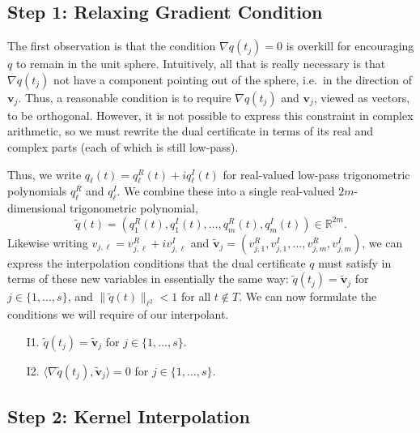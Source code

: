 \documentclass[11pt]{article}
\newcommand{\ra}{\rangle}
\newcommand{\la}{\langle}
\newcommand{\RR}{\mathbb{R}}
\newcommand{\bv}{\bm v}
\begin{document}
\subsection{Step 1: Relaxing Gradient Condition}

The first observation is that the condition $\nabla q(t_j) = 0$ is overkill for encouraging $q$ to remain in the unit sphere.
Intuitively, all that is really necessary is that $\nabla q(t_j)$ not have a component pointing out of the sphere, i.e.\ in the direction of $\bv_j$.
Thus, a reasonable condition is to require $\nabla q(t_j)$ and $\bv_j$, viewed as vectors, to be orthogonal.
However, it is not possible to express this constraint in complex arithmetic, so we must rewrite the dual certificate in terms of its real and complex parts (each of which is still low-pass).

Thus, we write $q_\ell(t) = q_\ell^R(t) + iq_\ell^I(t)$ for real-valued low-pass trigonometric polynomials $q_\ell^R$ and $q_\ell^I$.
We combine these into a single real-valued $2m$-dimensional trigonometric polynomial,
\begin{equation}
    \tilde{q}(t) = (q_1^R(t), q_1^I(t), \dots, q_m^R(t), q_m^I(t)) \in \RR^{2m}.
\end{equation}
Likewise writing $v_{j, \ell} = v_{j, \ell}^R + iv_{j, \ell}^I$ and $\tilde{\bv}_j = (v_{j, 1}^R, v_{j, 1}^I, \dots, v_{j, m}^R, v_{j, m}^I)$, we can express the interpolation conditions that the dual certificate $q$ must satisfy in terms of these new variables in essentially the same way: $\tilde{q}(t_j) = \tilde{\bv}_j$ for $j \in \{1, \dots, s\}$, and $\|\tilde{q}(t)\|_{\ell^2} < 1$ for all $t \notin T$.
We can now formulate the conditions we will require of our interpolant.
\begin{enumerate}
\item[I1.] $\tilde{q}(t_j) = \tilde{\bv}_j$ for $j \in \{1, \dots, s\}$.
\item[I2.] $\la \nabla \tilde{q}(t_j), \tilde{\bv}_j \ra = 0$ for $j \in \{1, \dots, s\}$.
\end{enumerate}

\subsection{Step 2: Kernel Interpolation}
\end{document}
